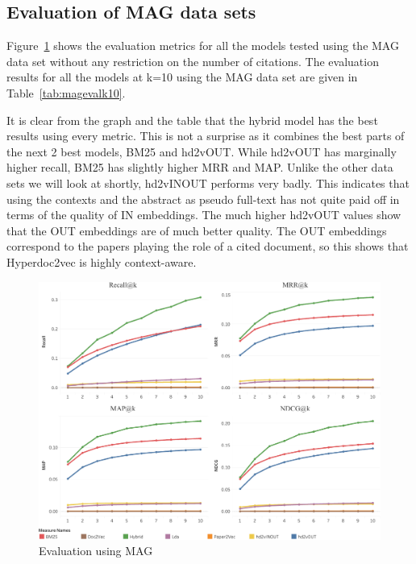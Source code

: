 \subsection{Evaluation of MAG data sets}
Figure~\ref{fig:magevaluation} shows the evaluation metrics for all the models tested using the MAG data set without any restriction on the number of citations. The evaluation results for all the models at k=10 using the MAG data set are given in Table~\ref{tab:magevalk10}.

It is clear from the graph and the table that the hybrid model has the best results using every metric. This is not a surprise as it combines the best parts of the next 2 best models, BM25 and hd2vOUT. While hd2vOUT has marginally higher recall, BM25 has slightly higher MRR and MAP. 
Unlike the other data sets we will look at shortly, hd2vINOUT performs very badly. This indicates that using the contexts and the abstract as pseudo full-text has not quite paid off in terms of the quality of IN embeddings. The much higher hd2vOUT values show that the OUT embeddings are of much better quality. The OUT embeddings correspond to the papers playing the role of a cited document, so this shows that Hyperdoc2vec is highly context-aware. 
\begin{figure}
    \centering
    \includegraphics[keepaspectratio, width=.9\linewidth]{figures/Evaluation/MAGMetricsGraph.pdf}
    \caption{Evaluation using MAG}
    \label{fig:magevaluation}
\end{figure}

